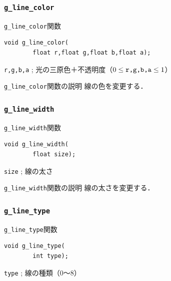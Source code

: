 \documentclass[platex,a4paper,12pt]{jsarticle}%
\begin{document}
\clearpage
\subsubsection{\texttt{g\_line\_color}}

\begin{itembox}[l]{\texttt{g\_line\_color}関数}
\begin{verbatim}
void g_line_color(
        float r,float g,float b,float a);
\end{verbatim}
\verb|r,g,b,a| ; 光の三原色＋不透明度（$0\leq \verb|r,g,b,a| \leq 1$）
\end{itembox}

\begin{itembox}[l]{\texttt{g\_line\_color}関数の説明}
線の色を変更する．
\end{itembox}

\subsubsection{\texttt{g\_line\_width}}

\begin{itembox}[l]{\texttt{g\_line\_width}関数}
\begin{verbatim}
void g_line_width(
        float size);
\end{verbatim}
\verb|size| ; 線の太さ
\end{itembox}

\begin{itembox}[l]{\texttt{g\_line\_width}関数の説明}
線の太さを変更する．
\end{itembox}

\subsubsection{\texttt{g\_line\_type}}

\begin{itembox}[l]{\texttt{g\_line\_type}関数}
\begin{verbatim}
void g_line_type(
        int type);
\end{verbatim}
\verb|type| ; 線の種類（0〜8）
\end{itembox}
\end{document}
